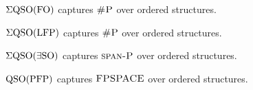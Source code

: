 \begin{theorem} \label{eqso-fo-cap}
	$\Sigma{\rm QSO}({\rm FO})$ captures $\text{\sc \#P}$ over ordered structures.
\end{theorem}

\begin{corollary} \label{eqso-lfp-cap}
	$\Sigma{\rm QSO}({\rm LFP})$ captures $\text{\sc \#P}$ over ordered structures.
\end{corollary}

\begin{theorem} \label{eqso-eso-cap}
	$\Sigma{\rm QSO}(\exists{\rm SO})$ captures $\text{\sc span-P}$ over ordered structures.
\end{theorem}

\begin{theorem} \label{qso-pfp-cap}
	${\rm QSO}({\rm PFP})$ captures $\text{\sc FPSPACE}$ over ordered structures.
\end{theorem}
